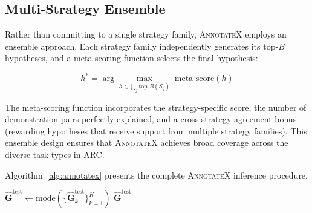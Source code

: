 \documentclass[conference,10pt,letterpaper]{IEEEtran}
\newcommand{\annotatexname}{\textsc{AnnotateX}}
\begin{document}
\subsection{Multi-Strategy Ensemble}

Rather than committing to a single strategy family, \annotatexname{} employs an ensemble approach. Each strategy family independently generates its top-$B$ hypotheses, and a meta-scoring function selects the final hypothesis:

\begin{equation}
    h^{*} = \arg\max_{h \in \bigcup_j \text{top-}B(\mathcal{S}_j)} \; \text{meta\_score}(h)
\end{equation}

The meta-scoring function incorporates the strategy-specific score, the number of demonstration pairs perfectly explained, and a cross-strategy agreement bonus (rewarding hypotheses that receive support from multiple strategy families). This ensemble design ensures that \annotatexname{} achieves broad coverage across the diverse task types in ARC.

Algorithm~\ref{alg:annotatex} presents the complete \annotatexname{} inference procedure.

\begin{algorithm}[t]
\caption{\annotatexname{} Inference Procedure}
\label{alg:annotatex}
\DontPrintSemicolon
\SetAlgoLined
{}
$\hat{\mathbf{G}}^{\text{test}} \leftarrow \text{mode}(\{\hat{\mathbf{G}}^{\text{test}}_k\}_{k=1}^{K})$\;
\Return $\hat{\mathbf{G}}^{\text{test}}$\;
\end{algorithm}
\end{document}
